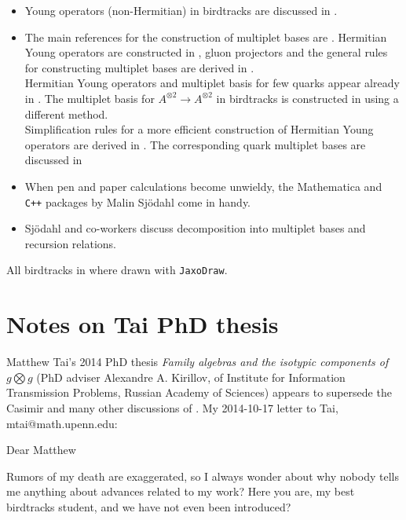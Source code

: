 \goodbreak
{}
\begin{itemize}
\item Young operators (non-Hermitian) in birdtracks are discussed in
 .
\item The main references for the construction of multiplet bases are
 . Hermitian Young operators are constructed
  in , gluon projectors and the general rules for
  constructing multiplet bases are derived in .
  \\[1ex]
  Hermitian Young operators and multiplet basis for few quarks appear
  already in . The multiplet basis for
  $A^{\otimes 2}\to A^{\otimes 2}$ in birdtracks is constructed in
  using a different method.
  \\[1ex]
  Simplification rules for a more efficient construction of Hermitian
  Young operators are derived in . The
  corresponding quark multiplet bases are discussed in
\item When pen and paper calculations become unwieldy, the Mathematica
  and {\tt C++} packages by Malin Sj\"odahl come in
  handy.
\item Sj\"odahl and co-workers discuss decomposition into multiplet
  bases and recursion relations.
\end{itemize}

 All birdtracks in  where drawn
with {\tt JaxoDraw}.


\section{Notes on Tai PhD thesis}
\label{s-groupTheBlog}

{Matthew Tai}'s 2014 PhD thesis
{\em Family algebras and the isotypic components of $g \bigotimes g$}
(PhD adviser
{Alexandre A. Kirillov}, of
 Institute for Information Transmission Problems, Russian Academy of Sciences)
appears to supersede the Casimir and many other discussions of {\wwwgt}.
My 2014-10-17 letter to Tai, mtai@math.upenn.edu:

Dear Matthew

Rumors of my death are exaggerated, so I always wonder about why nobody
tells me anything about advances related to my work? Here you are, my
best birdtracks student, and we have not even been introduced?

